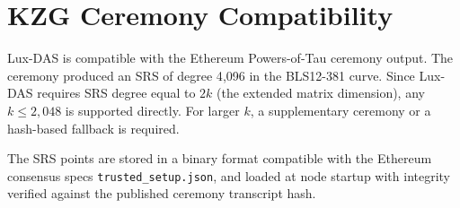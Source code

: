 \section{KZG Ceremony Compatibility}

\label{app:ceremony}

Lux-DAS is compatible with the Ethereum Powers-of-Tau ceremony output. The ceremony
produced an SRS of degree 4{,}096 in the BLS12-381 curve. Since Lux-DAS requires SRS
degree equal to $2k$ (the extended matrix dimension), any $k \leq 2{,}048$ is supported
directly. For larger $k$, a supplementary ceremony or a hash-based fallback is required.

The SRS points are stored in a binary format compatible with the Ethereum consensus specs
\texttt{trusted\_setup.json}, and loaded at node startup with integrity verified against the
published ceremony transcript hash.


